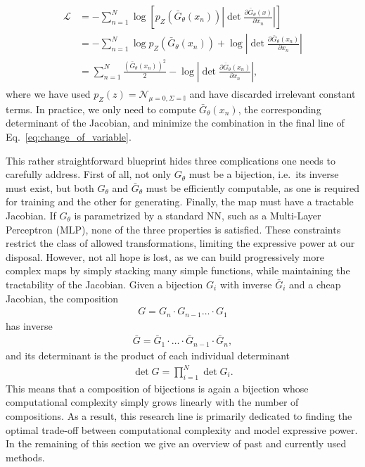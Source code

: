 %
\begin{align}\label{eq:change_of_variable}
\begin{split}
\mathcal{L} &= - \sum_{n=1}^N \log \left[ p_Z(\bar{G} _{\theta}(x_n)) \left|\det \frac{\partial \bar{G} _{\theta}(x)}{\partial x_n}\right| \right]\\
&= -\sum_{n=1}^N \log p_Z(\bar{G} _{\theta}(x_n)) + \log \left|\det \frac{\partial \bar{G} _{\theta}(x_n)}{\partial x_n}\right|\\
&= \sum_{n=1}^N \frac{(\bar{G} _{\theta}(x_n))^2}{2} - \log \left|\det \frac{\partial \bar{G} _{\theta}(x_n)}{\partial x_n}\right|,
\end{split}
\end{align}
%
where we have used $p_{Z}(z) = \mathcal{N}_{\mu=0, \Sigma=\mathbb{I}}$ and have discarded irrelevant constant terms. 
In practice, we only need to compute $\bar{G} _{\theta}(x_n)$, the corresponding determinant of the Jacobian, and minimize the combination in the final line of Eq.~\ref{eq:change_of_variable}.

This rather straightforward blueprint hides three complications one needs to carefully address. First of all, not only $G_{\theta}$ must be a bijection, i.e.\ its inverse must exist, but both $G_{\theta}$ and $\bar{G} _{\theta}$ must be efficiently computable, as one is required for training and the other for generating. Finally, the map must have a tractable Jacobian. If $G_{\theta}$ is parametrized by a standard NN, such as a Multi-Layer Perceptron (MLP), none of the three properties is satisfied. These constraints restrict the class of allowed transformations, limiting the expressive power at our disposal.
However, not all hope is lost, as we can build progressively more complex maps by simply stacking many simple functions, while maintaining the tractability of the Jacobian.
Given a bijection $G_{i}$ with inverse $\bar{G}_{i}$ and a cheap Jacobian, the composition
\begin{align}
G = G_{n} \cdot  G_{n-1} \ldots \cdot G_{1}
\end{align}
has inverse
\begin{align}
\bar{G} = \bar{G}_{1} \cdot   \ldots \cdot \bar{G}_{n-1} \cdot \bar{G}_{n},
\end{align}
and its determinant is the product of each individual determinant
\begin{align}
\det G = \prod_{i=1}^{N}  \det G_{i}.
\end{align}
This means that a composition of bijections is again a bijection whose computational complexity simply grows linearly with the number of compositions.
As a result, this research line is primarily dedicated to finding the optimal trade-off between computational complexity and model expressive power. 
In the remaining of this section we give an overview of past and currently used methods.

